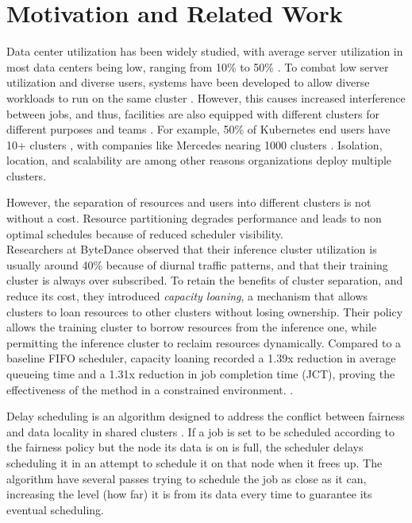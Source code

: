 \section{Motivation and Related Work}
Data center utilization has been widely studied, with average server utilization in most data centers being low, 
ranging from 10\% to 50\%
\cite{lo_heracles_2015}. 
To combat low server utilization and diverse users, systems have been developed to allow diverse workloads to run 
on the same cluster \cite{bhattacharya_hierarchical_2013, hindman_mesos_nodate}. 
However, this causes increased interference between jobs, and thus, 
facilities are also equipped with different clusters for different purposes and teams \cite{patel_what_2022, li_lyra_2023}. 
For example, 50\% of Kubernetes \cite{verma_large-scale_2015}
end users have 10+ clusters \cite{noauthor_cncf_2023} 
, with companies like Mercedes nearing 1000 clusters \cite{noauthor_mercedes-benz_2023}.
Isolation, location, and scalability are among other reasons organizations deploy multiple clusters.

However, the separation of resources and users into different clusters is not without a cost. 
Resource partitioning degrades performance %
and leads to non optimal schedules because of reduced scheduler visibility.\\ %
Researchers at ByteDance observed that their inference cluster utilization is usually around 40\% because 
of diurnal traffic patterns, and that their training cluster is always over subscribed. 
To retain the benefits of cluster separation, and reduce its cost, they introduced \textit{capacity loaning}, 
a mechanism that allows clusters to loan resources to other clusters without losing ownership.
Their policy allows the training cluster to borrow resources from the inference one, while permitting the 
inference cluster to reclaim resources dynamically. 
Compared to a baseline FIFO scheduler, capacity loaning recorded a 1.39x reduction in average queueing time and a 1.31x 
reduction in job completion time (JCT), proving the effectiveness of the method in a constrained environment. \cite{li_lyra_2023}.

Delay scheduling is an algorithm designed to address the conflict between fairness and data locality in 
shared clusters \cite{zaharia_delay_2010}. 
If a job is set to be scheduled according to the fairness policy but the node its data is on is full, 
the scheduler delays scheduling it in an attempt to schedule it on that node when it frees up. The algorithm have 
several passes trying to schedule the job as close as it can, increasing the level (how far) it is from its data every time 
to guarantee its eventual scheduling.
%

